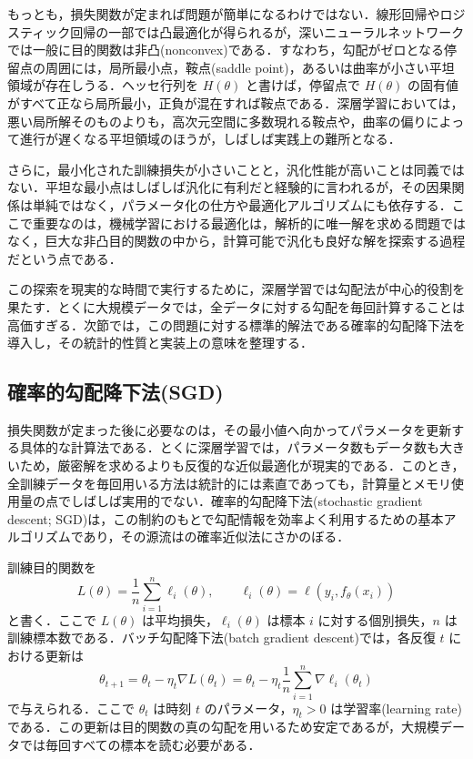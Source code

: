 もっとも，損失関数が定まれば問題が簡単になるわけではない．線形回帰やロジスティック回帰の一部では凸最適化\cite{Boyd2004}が得られるが，深いニューラルネットワークでは一般に目的関数は非凸(nonconvex)である．すなわち，勾配がゼロとなる停留点の周囲には，局所最小点，鞍点(saddle point)，あるいは曲率が小さい平坦領域が存在しうる．ヘッセ行列を $H(\theta)$ と書けば，停留点で $H(\theta)$ の固有値がすべて正なら局所最小，正負が混在すれば鞍点である．深層学習においては，悪い局所解そのものよりも，高次元空間に多数現れる鞍点や，曲率の偏りによって進行が遅くなる平坦領域のほうが，しばしば実践上の難所となる．

さらに，最小化された訓練損失が小さいことと，汎化性能が高いことは同義ではない．平坦な最小点はしばしば汎化に有利だと経験的に言われるが，その因果関係は単純ではなく，パラメータ化の仕方や最適化アルゴリズムにも依存する．ここで重要なのは，機械学習における最適化は，解析的に唯一解を求める問題ではなく，巨大な非凸目的関数の中から，計算可能で汎化も良好な解を探索する過程だという点である．

この探索を現実的な時間で実行するために，深層学習では勾配法が中心的役割を果たす．とくに大規模データでは，全データに対する勾配を毎回計算することは高価すぎる．次節では，この問題に対する標準的解法である確率的勾配降下法を導入し，その統計的性質と実装上の意味を整理する．

\subsection{確率的勾配降下法(SGD)}
損失関数が定まった後に必要なのは，その最小値へ向かってパラメータを更新する具体的な計算法である．とくに深層学習では，パラメータ数もデータ数も大きいため，厳密解を求めるよりも反復的な近似最適化が現実的である．このとき，全訓練データを毎回用いる方法は統計的には素直であっても，計算量とメモリ使用量の点でしばしば実用的でない．確率的勾配降下法(stochastic gradient descent; SGD)は，この制約のもとで勾配情報を効率よく利用するための基本アルゴリズムであり，その源流は\citet{RobbinsMonro1951}の確率近似法にさかのぼる．

訓練目的関数を
\begin{equation}
L(\theta)=\frac{1}{n}\sum_{i=1}^n \ell_i(\theta),
\qquad
\ell_i(\theta)=\ell(y_i,f_\theta(x_i))
\end{equation}
と書く．ここで $L(\theta)$ は平均損失，$\ell_i(\theta)$ は標本 $i$ に対する個別損失，$n$ は訓練標本数である．バッチ勾配降下法(batch gradient descent)では，各反復 $t$ における更新は
\begin{equation}
\theta_{t+1}
= \theta_t - \eta_t \nabla L(\theta_t)
= \theta_t - \eta_t \frac{1}{n}\sum_{i=1}^n \nabla \ell_i(\theta_t)
\end{equation}
で与えられる．ここで $\theta_t$ は時刻 $t$ のパラメータ，$\eta_t>0$ は学習率(learning rate)である．この更新は目的関数の真の勾配を用いるため安定であるが，大規模データでは毎回すべての標本を読む必要がある．

